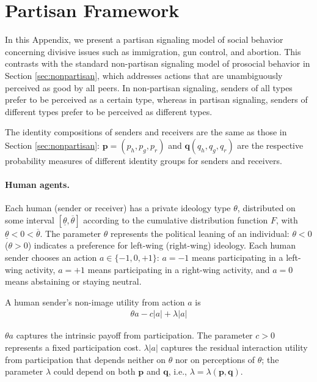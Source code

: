 \documentclass[english,12pt]{article}
\theoremstyle{plain}
\theoremstyle{plain}
\theoremstyle{definition}
\theoremstyle{definition}
\theoremstyle{assumption}
\theoremstyle{plain}
\theoremstyle{plain}
\theoremstyle{plain}
\theoremstyle{plain}
\theoremstyle{definition}%
\theoremstyle{plain}
\theoremstyle{plain}
\theoremstyle{plain}
\theoremstyle{plain}
\theoremstyle{plain}
\begin{document}
\section{Partisan Framework}\label{sec:partisan}

In this Appendix, we present a partisan signaling model of social behavior concerning divisive issues such as immigration, gun control, and abortion. This contrasts with the standard non-partisan signaling model of prosocial behavior in Section \ref{sec:nonpartisan}, which addresses actions that are unambiguously perceived as good by all peers. In non-partisan signaling, senders of all types prefer to be perceived as a certain type, whereas in partisan signaling, senders of different types prefer to be perceived as different types.


The identity compositions of senders and receivers are the same as those in Section \ref{sec:nonpartisan}: $\bm{p} = (p_h,p_g,p_r)$ and $\bm{q}  (q_h,q_g,q_r)$ are the respective probability measures of different identity groups for senders and receivers.


\paragraph{Human agents.} Each human (sender or receiver) has a private ideology type $\theta$, distributed on some interval $[\underline{\theta},\overline{\theta}]$ according to the cumulative distribution function $F$, with $\underline{\theta}<0<\overline{\theta}$. The parameter $\theta$ represents the political leaning of an individual: $\theta<0$ ($\theta>0$) indicates a preference for left-wing (right-wing) ideology. Each human sender chooses an action $a\in \{-1,0,+1\}$: $a=-1$ means participating in a left-wing activity, $a=+1$ means participating in a right-wing activity, and $a=0$ means abstaining or staying neutral.


A human sender's non-image utility from action $a$ is
\begin{align*}
    \theta a  - c|a| + \lambda |a|
\end{align*}

$\theta a$ captures the intrinsic payoff from participation. The parameter $c>0$ represents a fixed participation cost. $\lambda |a|$ captures the residual interaction utility from participation that depends neither on $\theta$ nor on perceptions of $\theta$; the parameter $\lambda$ could depend on both $\bm{p}$ and $\bm{q}$, i.e., $\lambda=\lambda(\bm{p},\bm{q})$.







\newpage

 
\end{document}
